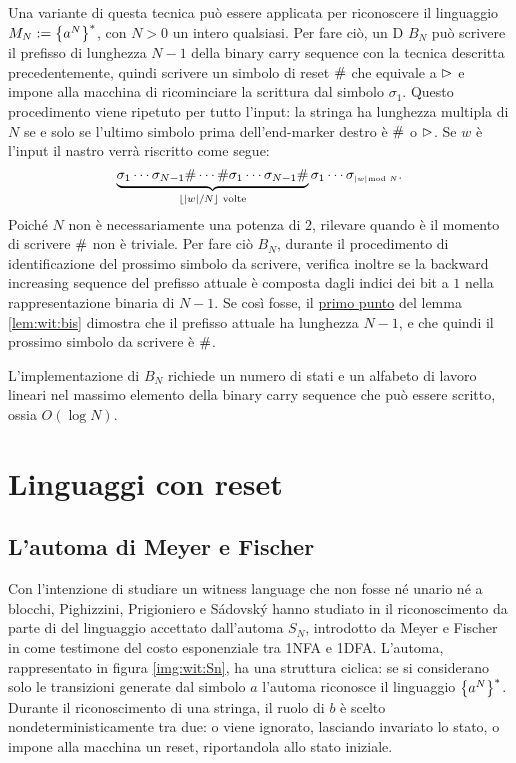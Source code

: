 Una variante di questa tecnica può essere applicata per riconoscere il linguaggio $M_N:=\left\{ a^N \right\}^*$, con $N>0$ un intero qualsiasi. Per fare ciò, un D $B_N$ può scrivere il prefisso di lunghezza $N-1$ della binary carry sequence con la tecnica descritta precedentemente, quindi scrivere un simbolo di reset $\#$ che equivale a $\rhd$ e impone alla macchina di ricominciare la scrittura dal simbolo $\sigma_1$. Questo procedimento viene ripetuto per tutto l'input: la stringa ha lunghezza multipla di $N$ se e solo se l'ultimo simbolo prima dell'end-marker destro è $\#$ o $\rhd$. Se $w$ è l'input il nastro verrà riscritto come segue:
\begin{equation*}
	\underbrace{\sigma_1\cdots\sigma_{N-1}\#\cdots\#\sigma_1\cdots\sigma_{N-1}\#}_{\lfloor |w|/N \rfloor \text{ volte}}\sigma_1\cdots\sigma_{\scriptscriptstyle |w|\mkern -11mu \mod N}\text.
\end{equation*}
Poiché $N$ non è necessariamente una potenza di $2$, rilevare quando è il momento di scrivere $\#$ non è triviale. Per fare ciò $B_N$, durante il procedimento di identificazione del prossimo simbolo da scrivere, verifica inoltre se la backward increasing sequence del prefisso attuale è composta dagli indici dei bit a $1$ nella rappresentazione binaria di $N-1$. Se così fosse, il \hyperref[lem:wit:bis:1]{primo punto} del lemma \ref{lem:wit:bis} dimostra che il prefisso attuale ha lunghezza $N-1$, e che quindi il prossimo simbolo da scrivere è $\#$.

L'implementazione di $B_N$ richiede un numero di stati e un alfabeto di lavoro lineari nel massimo elemento della binary carry sequence che può essere scritto, ossia $O(\log N)$.



\section{Linguaggi con reset}


\subsection{L'automa di Meyer e Fischer}
Con l'intenzione di studiare un witness language che non fosse né unario né a blocchi, Pighizzini, Prigioniero e Sádovský hanno studiato in \cite{Pighizzini:22:limitedwitness} il riconoscimento da parte di  del linguaggio accettato dall'automa $S_N$, introdotto da Meyer e Fischer in \cite{Meyer:71:ecodescription} come testimone del costo esponenziale tra 1NFA e 1DFA. L'automa, rappresentato in figura \ref{img:wit:Sn}, ha una struttura ciclica: se si considerano solo le transizioni generate dal simbolo $a$ l'automa riconosce il linguaggio $\left\{ a^N \right\}^*$. Durante il riconoscimento di una stringa, il ruolo di $b$ è scelto nondeterministicamente tra due: o viene ignorato, lasciando invariato lo stato, o impone alla macchina un reset, riportandola allo stato iniziale.

